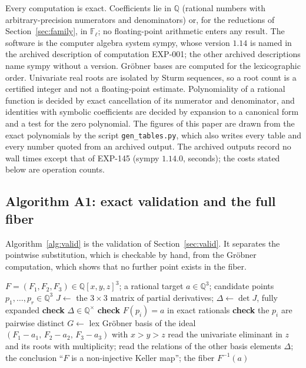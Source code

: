 \documentclass[11pt]{article}
\theoremstyle{definition}
\theoremstyle{remark}
\newcommand{\Q}{\mathbb{Q}}
\begin{document}
Every computation is exact. Coefficients lie in $\Q$ (rational numbers with arbitrary-precision numerators and denominators) or, for the
reductions of Section~\ref{sec:family}, in $\mathbb{F}_\ell$; no floating-point arithmetic enters any result. The software is the computer algebra system sympy,
whose version $1.14$ is named in the archived description of computation EXP-001; the other archived descriptions name sympy without a version. Gr\"obner
bases are computed for the lexicographic order. Univariate real roots are isolated by Sturm sequences, so a root count is a certified integer and not a floating-point estimate. Polynomiality of a rational function is decided by exact cancellation of its numerator and denominator, and identities with symbolic coefficients are decided by expansion to a canonical form and a test for the zero polynomial. The figures of this paper are drawn
from the exact polynomials by the script \texttt{gen\_tables.py}, which also writes every table and every number quoted from an archived output.
The archived outputs record no wall times except that of EXP-145 (sympy $1.14.0$, \numExpSeconds{} seconds); the costs stated below are operation counts.

\subsection{Algorithm A1: exact validation and the full fiber}

Algorithm~\ref{alg:valid} is the validation of Section~\ref{sec:valid}. It separates the pointwise substitution, which is checkable by hand, from the
Gr\"obner computation, which shows that no further point exists in the fiber.

\begin{algorithm}[t]
\caption{Exact validation of a candidate Keller map and the full fiber over a rational target.}\label{alg:valid}
\begin{algorithmic}[1]
\Require $F = (F_1,F_2,F_3) \in \Q[x,y,z]^3$; a rational target $a \in \Q^3$; candidate points $p_1,\dots,p_r \in \Q^3$
\State $J \gets$ the $3\times 3$ matrix of partial derivatives; $\Delta \gets \det J$, fully expanded
\State \textbf{check} $\Delta \in \Q^\times$
 \textbf{check} $F(p_i) = a$ in exact rationals \EndFor
\State \textbf{check} the $p_i$ are pairwise distinct
\State $G \gets$ lex Gr\"obner basis of the ideal $(F_1 - a_1,\, F_2 - a_2,\, F_3 - a_3)$ with $x > y > z$
\State read the univariate eliminant in $z$ and its roots with multiplicity; read the relations of the other basis elements
\Ensure $\Delta$; the conclusion ``$F$ is a non-injective Keller map''; the fiber $F^{-1}(a)$
\end{algorithmic}
\end{algorithm}
\end{document}
